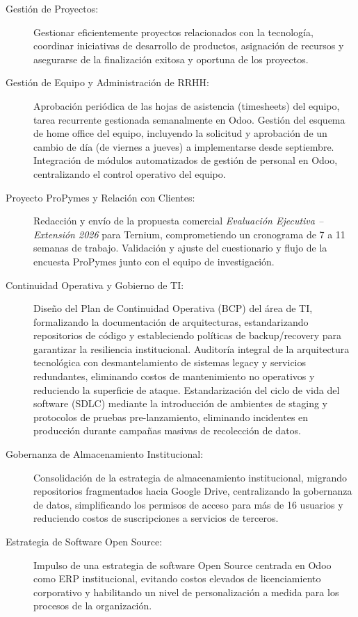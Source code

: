{\begin{description}
		\item[Gestión de Proyectos:] Gestionar eficientemente proyectos relacionados con la tecnología, coordinar iniciativas de desarrollo de productos, asignación de recursos y asegurarse de la finalización exitosa y oportuna de los proyectos.
		\item[Gestión de Equipo y Administración de RRHH:] Aprobación periódica de las hojas de asistencia (timesheets) del equipo, tarea recurrente gestionada semanalmente en Odoo. Gestión del esquema de home office del equipo, incluyendo la solicitud y aprobación de un cambio de día (de viernes a jueves) a implementarse desde septiembre. Integración de módulos automatizados de gestión de personal en Odoo, centralizando el control operativo del equipo.
		\item[Proyecto ProPymes y Relación con Clientes:] Redacción y envío de la propuesta comercial \emph{Evaluación Ejecutiva -- Extensión 2026} para Ternium, comprometiendo un cronograma de 7 a 11 semanas de trabajo. Validación y ajuste del cuestionario y flujo de la encuesta ProPymes junto con el equipo de investigación.
		\item[Continuidad Operativa y Gobierno de TI:] Diseño del Plan de Continuidad Operativa (BCP) del área de TI, formalizando la documentación de arquitecturas, estandarizando repositorios de código y estableciendo políticas de backup/recovery para garantizar la resiliencia institucional. Auditoría integral de la arquitectura tecnológica con desmantelamiento de sistemas legacy y servicios redundantes, eliminando costos de mantenimiento no operativos y reduciendo la superficie de ataque. Estandarización del ciclo de vida del software (SDLC) mediante la introducción de ambientes de staging y protocolos de pruebas pre-lanzamiento, eliminando incidentes en producción durante campañas masivas de recolección de datos.
		\item[Gobernanza de Almacenamiento Institucional:] Consolidación de la estrategia de almacenamiento institucional, migrando repositorios fragmentados hacia Google Drive, centralizando la gobernanza de datos, simplificando los permisos de acceso para más de 16 usuarios y reduciendo costos de suscripciones a servicios de terceros.
		\item[Estrategia de Software Open Source:] Impulso de una estrategia de software Open Source centrada en Odoo como ERP institucional, evitando costos elevados de licenciamiento corporativo y habilitando un nivel de personalización a medida para los procesos de la organización.
	\end{description}
}
